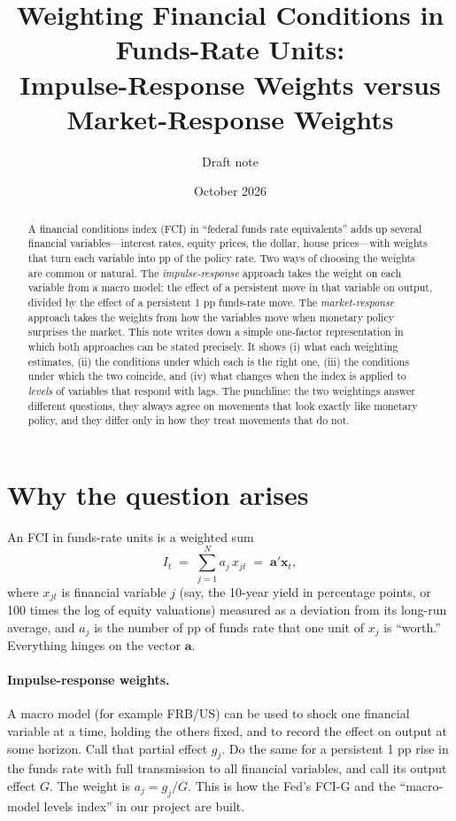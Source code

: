 \documentclass[11pt]{article}
\title{Weighting Financial Conditions in Funds-Rate Units:\\
Impulse-Response Weights versus Market-Response Weights}
\author{Draft note}
\date{October 2026}
\theoremstyle{definition}
\theoremstyle{remark}
\newcommand{\bx}{\mathbf{x}}
\newcommand{\ba}{\mathbf{a}}
\begin{document}
\maketitle

\begin{abstract}
\noindent A financial conditions index (FCI) in ``federal funds rate equivalents'' adds up several financial variables---interest rates, equity prices, the dollar, house prices---with weights that turn each variable into pp of the policy rate. Two ways of choosing the weights are common or natural. The \emph{impulse-response} approach takes the weight on each variable from a macro model: the effect of a persistent move in that variable on output, divided by the effect of a persistent 1 pp funds-rate move. The \emph{market-response} approach takes the weights from how the variables move when monetary policy surprises the market. This note writes down a simple one-factor representation in which both approaches can be stated precisely. It shows (i) what each weighting estimates, (ii) the conditions under which each is the right one, (iii) the conditions under which the two coincide, and (iv) what changes when the index is applied to \emph{levels} of variables that respond with lags. The punchline: the two weightings answer different questions, they always agree on movements that look exactly like monetary policy, and they differ only in how they treat movements that do not.
\end{abstract}

\section{Why the question arises}

An FCI in funds-rate units is a weighted sum
\[
I_t \;=\; \sum_{j=1}^N a_j\, x_{jt} \;=\; \ba'\bx_t ,
\]
where $x_{jt}$ is financial variable $j$ (say, the 10-year yield in percentage points, or 100 times the log of equity valuations) measured as a deviation from its long-run average, and $a_j$ is the number of pp of funds rate that one unit of $x_j$ is ``worth.'' Everything hinges on the vector $\ba$.

\paragraph{Impulse-response weights.} A macro model (for example FRB/US) can be used to shock one financial variable at a time, holding the others fixed, and to record the effect on output at some horizon. Call that partial effect $g_j$. Do the same for a persistent 1 pp rise in the funds rate with full transmission to all financial variables, and call its output effect $G$. The weight is $a_j = g_j/G$. This is how the Fed's FCI-G and the ``macro-model levels index'' in our project are built.
\end{document}
